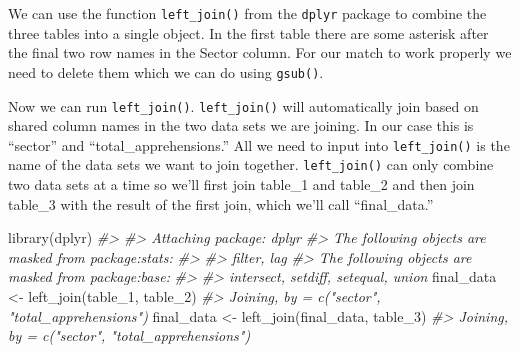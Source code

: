 \documentclass[
]{krantz}
\makeatletter
\newenvironment{Shaded}{\begin{snugshade}}{\end{snugshade}}
\newcommand{\CommentTok}[1]{\textcolor[rgb]{0.37,0.37,0.37}{\textit{#1}}}
\newcommand{\FunctionTok}[1]{\textcolor[rgb]{0,0,0}{#1}}
\newcommand{\NormalTok}[1]{#1}
\newcommand{\OtherTok}[1]{\textcolor[rgb]{0.37,0.37,0.37}{#1}}
\newcommand{\SpecialCharTok}[1]{\textcolor[rgb]{0,0,0}{#1}}
\newcommand{\StringTok}[1]{\textcolor[rgb]{0.5,0.5,0.5}{#1}}
\newenvironment{kframe}{%
\medskip{}
\setlength{\fboxsep}{.8em}
 \def\at@end@of@kframe{}%
 \ifinner\ifhmode%
  \def\at@end@of@kframe{\end{minipage}}%
  \begin{minipage}{\columnwidth}%
 \fi\fi%
 \def\FrameCommand##1{\hskip\@totalleftmargin \hskip-\fboxsep
 \colorbox{shadecolor}{##1}\hskip-\fboxsep
     \hskip-\linewidth \hskip-\@totalleftmargin \hskip\columnwidth}%
 \MakeFramed {\advance\hsize-\width
   \@totalleftmargin\z@ \linewidth\hsize
   \@setminipage}}%
 {\par\unskip\endMakeFramed%
 \at@end@of@kframe}
\renewenvironment{Shaded}{\begin{kframe}}{\end{kframe}}
\makeatother
\begin{document}
We can use the function \texttt{left\_join()} from the \texttt{dplyr} package to combine the three tables into a single object. In the first table there are some asterisk after the final two row names in the Sector column. For our match to work properly we need to delete them which we can do using \texttt{gsub()}.

\begin{Shaded}
\end{Shaded}

Now we can run \texttt{left\_join()}. \texttt{left\_join()} will automatically join based on shared column names in the two data sets we are joining. In our case this is ``sector'' and ``total\_apprehensions.'' All we need to input into \texttt{left\_join()} is the name of the data sets we want to join together. \texttt{left\_join()} can only combine two data sets at a time so we'll first join table\_1 and table\_2 and then join table\_3 with the result of the first join, which we'll call ``final\_data.''

\begin{Shaded}
\begin{Highlighting}[]
\FunctionTok{library}\NormalTok{(dplyr)}
\CommentTok{\#\textgreater{} }
\CommentTok{\#\textgreater{} Attaching package: \textquotesingle{}dplyr\textquotesingle{}}
\CommentTok{\#\textgreater{} The following objects are masked from \textquotesingle{}package:stats\textquotesingle{}:}
\CommentTok{\#\textgreater{} }
\CommentTok{\#\textgreater{}     filter, lag}
\CommentTok{\#\textgreater{} The following objects are masked from \textquotesingle{}package:base\textquotesingle{}:}
\CommentTok{\#\textgreater{} }
\CommentTok{\#\textgreater{}     intersect, setdiff, setequal, union}
\NormalTok{final\_data }\OtherTok{\textless{}{-}} \FunctionTok{left\_join}\NormalTok{(table\_1, table\_2)}
\CommentTok{\#\textgreater{} Joining, by = c("sector", "total\_apprehensions")}
\NormalTok{final\_data }\OtherTok{\textless{}{-}} \FunctionTok{left\_join}\NormalTok{(final\_data, table\_3)}
\CommentTok{\#\textgreater{} Joining, by = c("sector", "total\_apprehensions")}
\end{Highlighting}
\end{Shaded}
\end{document}
